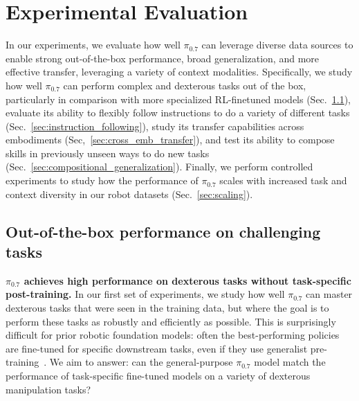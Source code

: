\documentclass[conference]{IEEEtran}
\def \MethodName {$\pi_{0.7}$}
\begin{document}
\section{Experimental Evaluation}
\label{sec:experiments}

In our experiments, we evaluate how well \MethodName{} can leverage diverse data sources to enable strong out-of-the-box performance, broad generalization, and more effective transfer, leveraging a variety of context modalities. Specifically, we study how well \MethodName{} can perform complex and dexterous tasks out of the box, particularly in comparison with more specialized RL-finetuned models (Sec.~\ref{sec:dexterity}), evaluate its ability to flexibly follow instructions to do a variety of different tasks (Sec.~\ref{sec:instruction_following}), study its transfer capabilities across embodiments (Sec,~\ref{sec:cross_emb_transfer}), and test its ability to compose skills in previously unseen ways to do new tasks (Sec.~\ref{sec:compositional_generalization}). Finally, we perform controlled experiments to study how the performance of \MethodName{} scales with increased task and context diversity in our robot datasets (Sec.~\ref{sec:scaling}).

\subsection{Out-of-the-box performance on challenging tasks}
\label{sec:dexterity}

\noindent \textbf{\MethodName{} achieves high performance on dexterous tasks without task-specific post-training.}
In our first set of experiments, we study how well \MethodName{} can master dexterous tasks that were seen in the training data, but where the goal is to perform these tasks as robustly and efficiently as possible. This is surprisingly difficult for prior robotic foundation models: often the best-performing policies are fine-tuned for specific downstream tasks, even if they use generalist pre-training~\citep{pistar06, pi06model}. We aim to answer: can the general-purpose \MethodName{} model match the performance of task-specific fine-tuned models on a variety of dexterous manipulation tasks?
\end{document}
